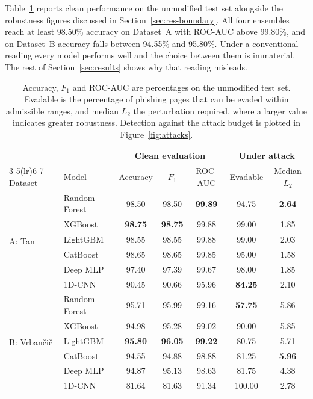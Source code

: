 \documentclass[runningheads]{llncs}
\begin{document}
Table~\ref{tab:main} reports clean performance on the unmodified test set
alongside the robustness figures discussed in Section~\ref{sec:res-boundary}.
All four ensembles reach at least 98.50\% accuracy on Dataset~A with ROC-AUC above
99.80\%, and on Dataset~B accuracy falls between 94.55\% and 95.80\%. Under a
conventional reading every model performs well and the choice between them is
immaterial. The rest of Section~\ref{sec:results} shows why that reading misleads.

\begin{table}[!htbp]
\centering
\caption{Accuracy, $F_1$ and ROC-AUC are percentages on the unmodified test set. Evadable is
the percentage of phishing pages that can be evaded within admissible ranges, and
median $L_2$ the perturbation required, where a larger value indicates greater
robustness. Detection against the attack budget is plotted in Figure~\ref{fig:attacks}.}
\label{tab:main}
\footnotesize
\setlength{\tabcolsep}{3.2pt}
\begin{tabular}{llccccc}
\toprule
& & \multicolumn{3}{c}{Clean evaluation} & \multicolumn{2}{c}{Under attack} \\
\cmidrule(lr){3-5}\cmidrule(lr){6-7}
Dataset & Model & Accuracy & $F_1$ & ROC-AUC & Evadable & Median $L_2$ \\
\midrule
\multirow{6}{*}{A: Tan}
 & Random Forest & 98.50 & 98.50 & \textbf{99.89} & 94.75 & \textbf{2.64} \\
 & XGBoost       & \textbf{98.75} & \textbf{98.75} & 99.88 & 99.00 & 1.85 \\
 & LightGBM      & 98.55 & 98.55 & 99.88 & 99.00 & 2.03 \\
 & CatBoost      & 98.65 & 98.65 & 99.85 & 95.00 & 1.58 \\
 & Deep MLP      & 97.40 & 97.39 & 99.67 & 98.00 & 1.85 \\
 & 1D-CNN        & 90.45 & 90.66 & 95.96 & \textbf{84.25} & 2.10 \\
\midrule
\multirow{6}{*}{B: Vrban\v{c}i\v{c}}
 & Random Forest & 95.71 & 95.99 & 99.16 & \textbf{57.75} & 5.86 \\
 & XGBoost       & 94.98 & 95.28 & 99.02 & 90.00 & 5.85 \\
 & LightGBM      & \textbf{95.80} & \textbf{96.05} & \textbf{99.22} & 80.75 & 5.71 \\
 & CatBoost      & 94.55 & 94.88 & 98.88 & 81.25 & \textbf{5.96} \\
 & Deep MLP      & 94.87 & 95.13 & 98.63 & 81.75 & 4.38 \\
 & 1D-CNN        & 81.64 & 81.63 & 91.34 & 100.00 & 2.78 \\
\bottomrule
\end{tabular}
\end{table}
\end{document}
